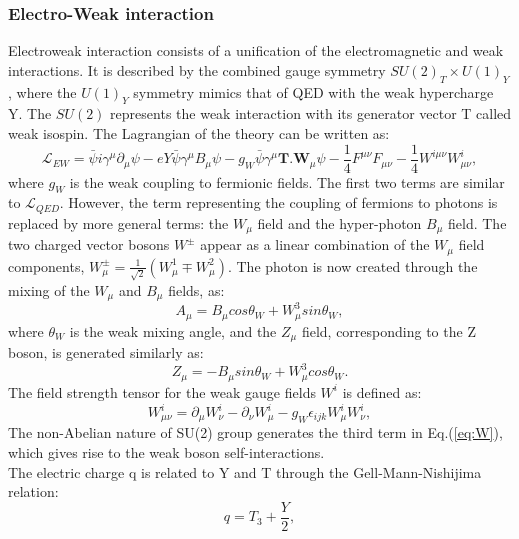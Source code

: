 \subsubsection{Electro-Weak interaction}
Electroweak interaction consists of a unification of the electromagnetic and weak interactions. It is described by the combined gauge symmetry $SU(2)_{T}\times U(1)_{Y}$, where the $U(1)_{Y}$ symmetry mimics that of QED with the weak hypercharge Y. The $SU(2)$ represents the weak interaction with its generator vector T called weak isospin. The Lagrangian of the theory can be written as: 
\begin{equation}
    \mathcal{L}_{EW} = \bar{\psi}i\gamma^\mu\partial_\mu\psi -eY\bar{\psi}\gamma^{\mu}B_{\mu}\psi-g_{W}\bar{\psi}\gamma^{\mu}\textbf{T.W$_\mu$}\psi
    -\frac{1}{4}F^{\mu\nu}F_{\mu\nu} - \frac{1}{4}W^{i\mu\nu}W^i_{\mu\nu},
\end{equation}
where $g_{W}$ is the weak coupling to fermionic fields. The first two terms are similar to $\mathcal{L}_{QED}$. However, the term representing the coupling of fermions to photons is replaced by more general terms: the $W_{\mu}$ field and the hyper-photon $B_{\mu}$ field. The two charged vector bosons $W^\pm$ appear as a linear combination of the $W_{\mu}$ field components, $W^{\pm}_{\mu} = \frac{1}{\sqrt{2}}(W^1_{\mu}\mp W^2_{\mu})$. The photon is now created through the mixing of the $W_{\mu}$ and $B_{\mu}$ fields, as:
\begin{equation}
    A_{\mu} = B_{\mu}cos\theta_{W} + W^3_{\mu}sin\theta_{W},
\end{equation}
where $\theta_{W}$ is the weak mixing angle, and the $Z_{\mu}$ field, corresponding to the Z boson, is generated similarly as: 
\begin{equation}
     Z_{\mu} = -B_{\mu}sin\theta_{W} + W^3_{\mu}cos\theta_{W}.
\end{equation}
The field strength tensor for the weak gauge fields $W^i$ is defined as:
\begin{equation}
    W^{i}_{\mu\nu} = \partial_{\mu}W^i_{\nu} - \partial_{\nu}W^i_{\mu} - g_{W}\epsilon_{ijk}W^i_{\mu}W^i_{\nu},
    \label{eq:W}
\end{equation}
The non-Abelian nature of SU(2) group generates the third term in Eq.(\ref{eq:W}), which gives rise to the weak boson self-interactions. \\
The electric charge q is related to Y and T through the Gell-Mann-Nishijima relation:
\begin{equation}
    q = T_3 + \frac{Y}{2},
\end{equation}
